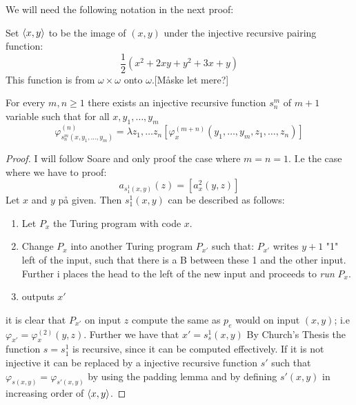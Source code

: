 \documentclass[../main.tex]{subfiles}
\begin{document}
We will need the following notation in the next proof:
\begin{defi}
	Set $\langle x,y\rangle$ to be the image of $(x,y)$ under the injective
	recursive  pairing function:
	$$\frac{1}{2}(x^2+2xy+y^2+3x+y)$$
	This function is from $\omega\times\omega$ onto $\omega$.[Måske let
	mere?]
\end{defi}
\begin{thm}
	For every $m,n\geq 1$ there exists an injective recursive function
	$s_n^m$ of $m+1$ variable such that for all $x,y_1,\ldots,y_m$
	$$\varphi^{(n)}_{s^m_n(x,y_1,\ldots,y_m)}=\lambda z_1,\ldots
	z_n[\varphi^{(m+n)}_x(y_1,\ldots,y_m,z_1,\ldots,z_n)]$$
\end{thm}
\begin{proof}
	I will follow Soare and only proof the case where $m=n=1$. I.e the case
	where we have to proof:
	$$a_{s^1_1(x,y)}(z)=[a_x^{2}(y,z)]$$
	Let $x$ and $y$ på given. Then $s^1_1(x,y)$ can be described as
	follows:
	\begin{enumerate}
		\item Let $P_x$ the Turing program with code $x$.
		\item Change $P_x$ into another Turing program $P_{x'}$ such
			that: $P_{x'}$ writes $y+1$ "1" left of the input, such
			that there is a B between these 1 and the other input.
			Further i places the head to the left of the new input
			and proceeds to \textit{run} $P_x$.
		\item outputs $x'$
	\end{enumerate}
	it is clear that $P_{x'}$ on input $z$ compute the same as $p_e$ would
	on input $(x,y)$; i.e $\varphi_{x'}=\varphi_x^{(2)}(y,z)$. Further we
	have that $x'=s^1_s(x,y)$
	By Church's Thesis the function $s=s^1_1$ is recursive, since it can be
	computed effectively. If it is not injective it can be replaced by a
	injective recursive function $s'$ such that
	$\varphi_{s(x,y)}=\varphi_{s'(x,y)}$ by using the padding lemma and by
	defining $s'(x,y)$ in increasing order of $\langle x,y\rangle$.
\end{proof}
\end{document}
